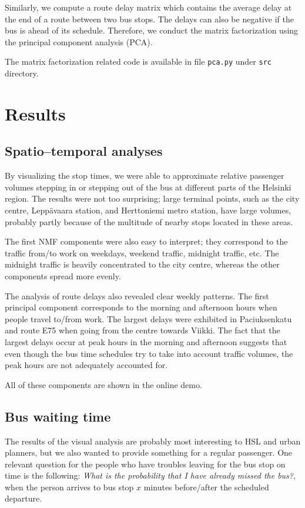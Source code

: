 \documentclass[a4paper,12pt]{article}
\begin{document}
Similarly, we compute a route delay matrix which contains the average delay at 
the end of a route between two bus stops. The delays can also be negative if 
the bus is ahead of its schedule. Therefore, we conduct the matrix 
factorization using the principal component analysis (PCA).

The matrix factorization related code is available in file \texttt{pca.py} under
\texttt{src} directory.

\section{Results} \label{sec:res}

\subsection{Spatio--temporal analyses}

By visualizing the stop times, we were able to approximate relative passenger 
volumes stepping in or stepping out of the bus at different parts of the 
Helsinki region. The results were not too surprising; large terminal points, 
such as the city centre, Leppävaara station, and Herttoniemi metro station, 
have large volumes, probably partly because of the multitude of nearby stops 
located in these areas.

The first NMF components were also easy to interpret; 
they correspond to the traffic from/to work on weekdays, weekend traffic,
midnight traffic, etc. The midnight traffic is heavily concentrated to the city 
centre, whereas the other components spread more evenly.

The analysis of route delays also revealed clear weekly patterns. The first 
principal component corresponds to the morning and afternoon hours when people 
travel to/from work. The largest delays were exhibited in Paciuksenkatu and 
route E75 when going from the centre towards Viikki. The fact that the largest 
delays occur at peak hours in the morning and afternoon suggests that 
even though the bus time schedules try to take into account traffic volumes, 
the peak hours are not adequately accounted for.

All of these components are shown in the online demo.

\subsection{Bus waiting time}

The results of the visual analysis are probably most interesting to HSL and 
urban planners, but we also wanted to provide something for a regular 
passenger. One relevant question for the people who have troubles leaving for 
the bus stop on time is the following: \emph{What is the probability that I 
have already missed the bus?}, when the person arrives to bus stop $x$ minutes 
before/after the scheduled departure.
\end{document}
